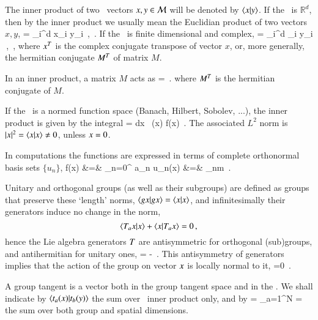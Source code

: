 The inner product of two \statesp\ vectors $x, y \in {\cal M}$ will be denoted by $\braket{x}{y}$. If the \statesp\ is $\mathbb{R}^d$, then by the inner product we usually mean the Euclidian product of two vectors $x,y$,
\beq
{} = \sum_i^d {x}_i y_i
    \,,\qquad \pS \subset \reals
\,.
If the \statesp\ is finite dimensional and complex,
\beq
{} = \sum_i^d _i y_i
    \,,\qquad \pS \subset \complex
\,,
where $\dual{x}$ is the complex conjugate transpose of vector $x$, or, more generally, the hermitian conjugate $\dual{M}$ of matrix $M$.

In an inner product, a matrix $M$ acts as
\beq
{} =
\,.
where $\dual{M}$ is the hermitian conjugate of $M$.

If the \statesp\ is a normed function space (Banach, Hilbert, Sobolev, ...),
the inner product is given by the integral
\beq
{} = \int dx \, (x) f(x)
\,.
The associated $L^2$ norm is
$|\ssp|^2 = \braket{\ssp}{\ssp} \neq 0$, unless $\ssp = 0$.

In computations the functions are expressed in terms of
complete orthonormal basis sets $\{u_n\}$,
\bea
f(x) &=& \sum_{n=0}^{\infty} a_n u_n(x)
    \continue
{} &=& \delta_{nm}
\,.
\label{basisL2}
\eea

Unitary and orthogonal groups (as well as their subgroups) are defined as groups that preserve these `length' norms, $\braket{\LieEl x}{\LieEl x} =  \braket{x}{x}$, and infinitesimally their generators  induce no change in the norm,
\[
\braket{ \Lg_a\ssp}{\ssp}
  +\braket{\ssp}{\Lg_a\ssp} =0
\,,
\]
hence the Lie algebra generators
$T$ are antisymmetric for orthogonal (sub)groups,
and antihermitian for unitary ones,
\beq
\dual{\Lg} = - \Lg
\,.
This antisymmetry of generators
implies that the action of the group on vector $x$ is
locally normal to it,
\beq
{} =0
\,.

A group tangent  is a vector both in the group
tangent space and in the \statesp.
We shall indicate by $\braket{\groupTan_{a}(x)}{\groupTan_{b}(y)}$  the sum over \statesp\ inner product only, and by
\beq
{} =
    \sum_{a=1}^N  =
the sum over both group and spatial dimensions.

